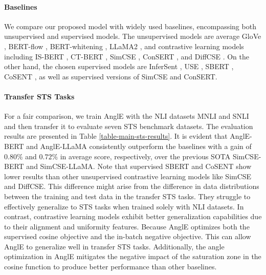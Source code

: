 \documentclass{article} \usepackage{iclr2024_conference,times}
\begin{document}
\paragraph{Baselines} We compare our proposed model with widely used baselines, encompassing both unsupervised and supervised models. The unsupervised models are average GloVe \citep{pennington-etal-2014-glove}, 
BERT-flow \citep{li-etal-2020-sentence}, BERT-whitening \citep{su2021whitening}, LLaMA2 \citep{touvron2023llama2}, and contrastive learning models including IS-BERT \citep{zhang-etal-2020-unsupervised}, CT-BERT \citep{carlsson2020semantic}, SimCSE \citep{simcse_gao_2021}, ConSERT \citep{consert_yan_2021}, and DiffCSE \citep{chuang-etal-2022-diffcse}. On the other hand, the chosen supervised models are InferSent \citep{conneau-etal-2017-supervised}, USE \citep{cer-etal-2018-universal}, SBERT \citep{sbert-nils-2019}, CoSENT \citep{cosent_su_2022}, as well as supervised versions of SimCSE and ConSERT.

\paragraph{Transfer STS Tasks} For a fair comparison, we train AnglE with the NLI datasets MNLI \citep{williams-etal-2018-broad} and SNLI \citep{bowman-etal-2015-large} and then transfer it to evaluate seven STS benchmark datasets. The evaluation results are presented in Table \ref{table-main-sts-results}. It is evident that AnglE-BERT and AnglE-LLaMA consistently outperform the baselines with a gain of $0.80\%$ and $0.72\%$ in average score, respectively, over the previous SOTA SimCSE-BERT and SimCSE-LLaMA. Note that supervised SBERT and CoSENT show lower results than other unsupervised contrastive learning models like SimCSE and DiffCSE. This difference might arise from the difference in data distributions between the training and test data in the transfer STS tasks. They struggle to effectively generalize to STS tasks when trained solely with NLI datasets.
In contrast, contrastive learning models exhibit better generalization capabilities due to their alignment and uniformity features.
Because AnglE optimizes both the supervised cosine objective and the in-batch negative objective. This can allow AnglE to generalize well in transfer STS tasks. Additionally, the angle optimization in AnglE mitigates the negative impact of the saturation zone in the cosine function to produce better performance than other baselines. 
\end{document}
